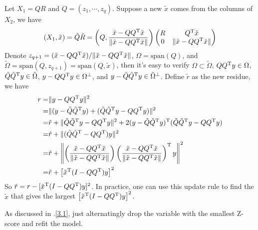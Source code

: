 \begin{sol}
Let $X_1=QR$ and $Q=(z_1,\cdots,z_q)$. Suppose a new $\tilde{x}$ comes from the columns of $X_2$, we have
\[
(X_1, \tilde{x})=\tilde{Q}\tilde{R}=\left(Q,\frac{\tilde{x}-QQ^{\mathrm{T}}\tilde{x}}{\|\tilde{x}-QQ^{\mathrm{T}}\tilde{x}\|}\right)
\begin{pmatrix}
R & Q^{\mathrm{T}}\tilde{x}\\
0 & \|\tilde{x}-QQ^{\mathrm{T}}\tilde{x}\|
\end{pmatrix}
\]
Denote $z_{q+1}=(\tilde{x}-QQ^{\mathrm{T}}\tilde{x})/\|\tilde{x}-QQ^{\mathrm{T}}\tilde{x}\|$, $\Omega=\mathrm{span}(Q)$, and $\tilde{\Omega}=\mathrm{span}(Q,z_{q+1})=\mathrm{span}(Q,\tilde{x})$, then it's easy to verify
$\Omega\subset\tilde{\Omega}$, $QQ^{\mathrm{T}}y\in \Omega$, $\tilde{Q}\tilde{Q}^{\mathrm{T}}y\in \tilde{\Omega}$, $y-QQ^{\mathrm{T}}y\in \Omega^\perp$, and $y-\tilde{Q}\tilde{Q}^{\mathrm{T}}y\in \tilde{\Omega}^\perp$. Define $\tilde{r}$ as the new residue, we have
\begin{align*}
r =& \|y-QQ^{\mathrm{T}}y\|^2\\
=& \|(y-\tilde{Q}\tilde{Q}^{\mathrm{T}}y)+(\tilde{Q}\tilde{Q}^{\mathrm{T}}y-QQ^{\mathrm{T}}y)\|^2\\
=& \tilde{r} + \|\tilde{Q}\tilde{Q}^{\mathrm{T}}y-QQ^{\mathrm{T}}y\|^2 + 2(y-\tilde{Q}\tilde{Q}^{\mathrm{T}}y)^{\mathrm{T}}(\tilde{Q}\tilde{Q}^{\mathrm{T}}y-QQ^{\mathrm{T}}y)\\
=& \tilde{r} + \|(\tilde{Q}\tilde{Q}^{\mathrm{T}}-QQ^{\mathrm{T}})y\|^2\\
=& \tilde{r} + \left\|\left(\frac{\tilde{x}-QQ^{\mathrm{T}}\tilde{x}}{\|\tilde{x}-QQ^{\mathrm{T}}\tilde{x}\|}\right)\left(\frac{\tilde{x}-QQ^{\mathrm{T}}\tilde{x}}{\|\tilde{x}-QQ^{\mathrm{T}}\tilde{x}\|}\right)^{\mathrm{T}}y\right\|^2\\
=& \tilde{r} + \left[\tilde{x}^{\mathrm{T}}(I-QQ^{\mathrm{T}})y\right]^2
\end{align*}
So $\tilde{r}=r-[\tilde{x}^{\mathrm{T}}(I-QQ^{\mathrm{T}})y]^2$. In practice, one can use this update rule to find the $\tilde{x}$ that gives the largest $\left[\tilde{x}^{\mathrm{T}}(I-QQ^{\mathrm{T}})y\right]^2$.
\end{sol}

\begin{sol}
As discussed in \thesection.\ref{3.1}, just alternatingly drop the variable with the smallest Z-score and refit the model.
\end{sol}


